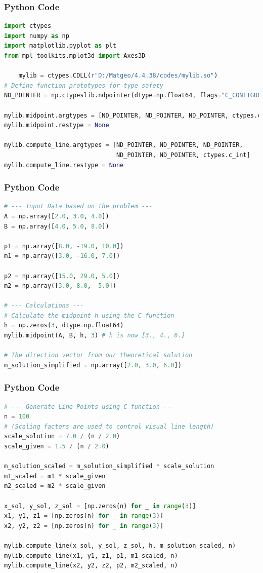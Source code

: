 \documentclass{beamer}
\begin{document}
\begin{frame}[fragile]
  \frametitle{Python Code}
  \begin{lstlisting}[language=Python]
import ctypes
import numpy as np
import matplotlib.pyplot as plt
from mpl_toolkits.mplot3d import Axes3D

    mylib = ctypes.CDLL(r"D:/Matgeo/4.4.38/codes/mylib.so")
# Define function prototypes for type safety
ND_POINTER = np.ctypeslib.ndpointer(dtype=np.float64, flags="C_CONTIGUOUS")

mylib.midpoint.argtypes = [ND_POINTER, ND_POINTER, ND_POINTER, ctypes.c_int]
mylib.midpoint.restype = None

mylib.compute_line.argtypes = [ND_POINTER, ND_POINTER, ND_POINTER, 
                               ND_POINTER, ND_POINTER, ctypes.c_int]
mylib.compute_line.restype = None
  \end{lstlisting}
\end{frame}

\begin{frame}[fragile]
  \frametitle{Python Code}
  \begin{lstlisting}[language=Python]
# --- Input Data based on the problem ---
A = np.array([2.0, 3.0, 4.0])
B = np.array([4.0, 5.0, 8.0])

p1 = np.array([8.0, -19.0, 10.0])
m1 = np.array([3.0, -16.0, 7.0])

p2 = np.array([15.0, 29.0, 5.0])
m2 = np.array([3.0, 8.0, -5.0])

# --- Calculations ---
# Calculate the midpoint h using the C function
h = np.zeros(3, dtype=np.float64)
mylib.midpoint(A, B, h, 3) # h is now [3., 4., 6.]

# The direction vector from our theoretical solution
m_solution_simplified = np.array([2.0, 3.0, 6.0])
  \end{lstlisting}
\end{frame}
\begin{frame}[fragile]
  \frametitle{Python Code}
  \begin{lstlisting}[language=Python]
# --- Generate Line Points using C function ---
n = 100
# (Scaling factors are used to control visual line length)
scale_solution = 7.0 / (n / 2.0)
scale_given = 1.5 / (n / 2.0)

m_solution_scaled = m_solution_simplified * scale_solution
m1_scaled = m1 * scale_given
m2_scaled = m2 * scale_given

x_sol, y_sol, z_sol = [np.zeros(n) for _ in range(3)]
x1, y1, z1 = [np.zeros(n) for _ in range(3)]
x2, y2, z2 = [np.zeros(n) for _ in range(3)]

mylib.compute_line(x_sol, y_sol, z_sol, h, m_solution_scaled, n)
mylib.compute_line(x1, y1, z1, p1, m1_scaled, n)
mylib.compute_line(x2, y2, z2, p2, m2_scaled, n)
  \end{lstlisting}
\end{frame}
\end{document}
